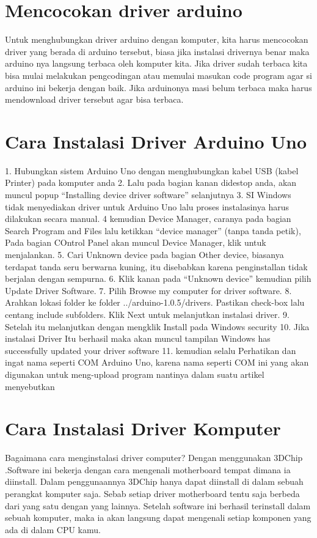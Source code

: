 \section{Mencocokan driver arduino}
Untuk menghubungkan driver arduino dengan komputer, kita harus mencocokan driver yang berada di arduino tersebut, biasa jika instalasi drivernya benar maka arduino nya langsung terbaca oleh komputer kita. Jika driver sudah terbaca kita bisa mulai melakukan pengcodingan atau memulai masukan code program agar si arduino ini bekerja dengan baik. Jika arduinonya masi belum terbaca maka harus mendownload driver tersebut agar bisa terbaca.

\section{Cara Instalasi Driver Arduino Uno}
1. Hubungkan sistem  Arduino Uno dengan menghubungkan kabel USB (kabel Printer) pada komputer anda
2. Lalu pada bagian kanan didestop anda, akan muncul popup “Installing device driver software” selanjutnya
3. SI Windows tidak menyediakan driver untuk Arduino Uno lalu proses instalasinya harus dilakukan secara manual.
4 kemudian Device Manager, caranya pada bagian Search Program and Files lalu ketikkan “device manager” (tanpa tanda petik), Pada bagian COntrol Panel akan muncul Device Manager, klik untuk menjalankan.
5. Cari Unknown device pada bagian Other device, biasanya terdapat tanda seru berwarna kuning, itu disebabkan karena penginstallan tidak berjalan dengan sempurna.
6. Klik kanan pada “Unknown device” kemudian pilih Update Driver Software.
7. Pilih Browse my computer for driver software.
8. Arahkan lokasi folder ke folder ../arduino-1.0.5/drivers. Pastikan check-box lalu centang include subfolders. Klik Next untuk melanjutkan instalasi driver.
9. Setelah itu melanjutkan dengan mengklik Install pada Windows security
10. Jika instalasi Driver Itu berhasil maka akan muncul tampilan Windows has successfully updated your driver software
11. kemudian selalu Perhatikan dan ingat nama seperti COM Arduino Uno, karena nama  seperti COM ini yang akan  digunakan untuk meng-upload program nantinya
dalam suatu artikel menyebutkan \cite{teikari2012inexpensive}

\section{Cara Instalasi Driver Komputer}
Bagaimana cara menginstalasi driver computer? 
Dengan menggunakan 3DChip .Software ini bekerja dengan cara mengenali motherboard tempat dimana ia diinstall. Dalam penggunaannya 3DChip hanya dapat diinstall di dalam sebuah perangkat komputer saja. Sebab setiap driver motherboard tentu saja berbeda dari  yang satu dengan yang lainnya. Setelah software ini berhasil terinstall dalam sebuah komputer, maka ia akan langsung dapat mengenali setiap komponen yang ada di dalam CPU kamu. 

